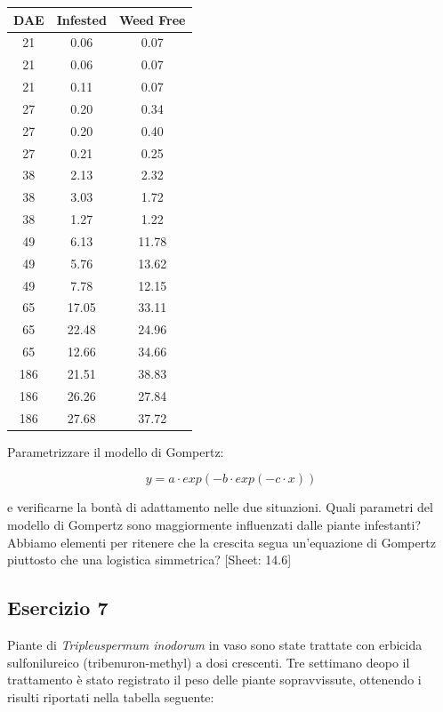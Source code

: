 \documentclass[a4paper,12pt,oneside]{book}
\begin{document}
\begin{longtable}[]{@{}ccc@{}}
\toprule
DAE & Infested & Weed Free \\
\midrule
\endhead
21 & 0.06 & 0.07 \\
21 & 0.06 & 0.07 \\
21 & 0.11 & 0.07 \\
27 & 0.20 & 0.34 \\
27 & 0.20 & 0.40 \\
27 & 0.21 & 0.25 \\
38 & 2.13 & 2.32 \\
38 & 3.03 & 1.72 \\
38 & 1.27 & 1.22 \\
49 & 6.13 & 11.78 \\
49 & 5.76 & 13.62 \\
49 & 7.78 & 12.15 \\
65 & 17.05 & 33.11 \\
65 & 22.48 & 24.96 \\
65 & 12.66 & 34.66 \\
186 & 21.51 & 38.83 \\
186 & 26.26 & 27.84 \\
186 & 27.68 & 37.72 \\
\bottomrule
\end{longtable}

Parametrizzare il modello di Gompertz:

\[y = a \cdot exp(-b \cdot exp(-c \cdot x))\]

e verificarne la bontà di adattamento nelle due situazioni. Quali parametri del modello di Gompertz sono maggiormente influenzati dalle piante infestanti? Abbiamo elementi per ritenere che la crescita segua un'equazione di Gompertz piuttosto che una logistica simmetrica?
{[}Sheet: 14.6{]}

\hypertarget{esercizio-7-2}{%
\subsection{Esercizio 7}\label{esercizio-7-2}}

Piante di \emph{Tripleuspermum inodorum} in vaso sono state trattate con erbicida sulfonilureico (tribenuron-methyl) a dosi crescenti. Tre settimano deopo il trattamento è stato registrato il peso delle piante sopravvissute, ottenendo i risulti riportati nella tabella seguente:
\end{document}
